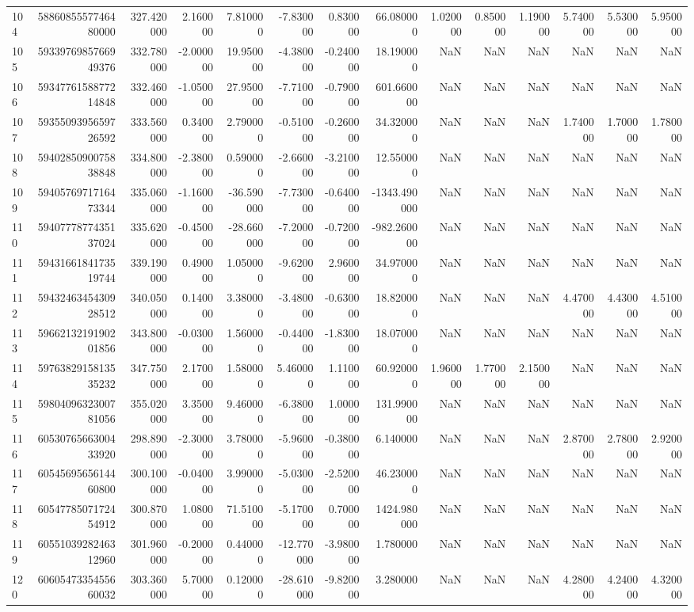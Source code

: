 \begin{tabular}{lrrrrrrrrrrrrr}
104 & 5886085557746480000 & 327.420000 & 2.160000 & 7.810000 & -7.830000 & 0.830000 & 66.080000 & 1.020000 & 0.850000 & 1.190000 & 5.740000 & 5.530000 & 5.950000 \\
105 & 5933976985766949376 & 332.780000 & -2.000000 & 19.950000 & -4.380000 & -0.240000 & 18.190000 & NaN & NaN & NaN & NaN & NaN & NaN \\
106 & 5934776158877214848 & 332.460000 & -1.050000 & 27.950000 & -7.710000 & -0.790000 & 601.660000 & NaN & NaN & NaN & NaN & NaN & NaN \\
107 & 5935509395659726592 & 333.560000 & 0.340000 & 2.790000 & -0.510000 & -0.260000 & 34.320000 & NaN & NaN & NaN & 1.740000 & 1.700000 & 1.780000 \\
108 & 5940285090075838848 & 334.800000 & -2.380000 & 0.590000 & -2.660000 & -3.210000 & 12.550000 & NaN & NaN & NaN & NaN & NaN & NaN \\
109 & 5940576971716473344 & 335.060000 & -1.160000 & -36.590000 & -7.730000 & -0.640000 & -1343.490000 & NaN & NaN & NaN & NaN & NaN & NaN \\
110 & 5940777877435137024 & 335.620000 & -0.450000 & -28.660000 & -7.200000 & -0.720000 & -982.260000 & NaN & NaN & NaN & NaN & NaN & NaN \\
111 & 5943166184173519744 & 339.190000 & 0.490000 & 1.050000 & -9.620000 & 2.960000 & 34.970000 & NaN & NaN & NaN & NaN & NaN & NaN \\
112 & 5943246345430928512 & 340.050000 & 0.140000 & 3.380000 & -3.480000 & -0.630000 & 18.820000 & NaN & NaN & NaN & 4.470000 & 4.430000 & 4.510000 \\
113 & 5966213219190201856 & 343.800000 & -0.030000 & 1.560000 & -0.440000 & -1.830000 & 18.070000 & NaN & NaN & NaN & NaN & NaN & NaN \\
114 & 5976382915813535232 & 347.750000 & 2.170000 & 1.580000 & 5.460000 & 1.110000 & 60.920000 & 1.960000 & 1.770000 & 2.150000 & NaN & NaN & NaN \\
115 & 5980409632300781056 & 355.020000 & 3.350000 & 9.460000 & -6.380000 & 1.000000 & 131.990000 & NaN & NaN & NaN & NaN & NaN & NaN \\
116 & 6053076566300433920 & 298.890000 & -2.300000 & 3.780000 & -5.960000 & -0.380000 & 6.140000 & NaN & NaN & NaN & 2.870000 & 2.780000 & 2.920000 \\
117 & 6054569565614460800 & 300.100000 & -0.040000 & 3.990000 & -5.030000 & -2.520000 & 46.230000 & NaN & NaN & NaN & NaN & NaN & NaN \\
118 & 6054778507172454912 & 300.870000 & 1.080000 & 71.510000 & -5.170000 & 0.700000 & 1424.980000 & NaN & NaN & NaN & NaN & NaN & NaN \\
119 & 6055103928246312960 & 301.960000 & -0.200000 & 0.440000 & -12.770000 & -3.980000 & 1.780000 & NaN & NaN & NaN & NaN & NaN & NaN \\
120 & 6060547335455660032 & 303.360000 & 5.700000 & 0.120000 & -28.610000 & -9.820000 & 3.280000 & NaN & NaN & NaN & 4.280000 & 4.240000 & 4.320000 \\
\bottomrule
\end{tabular}
